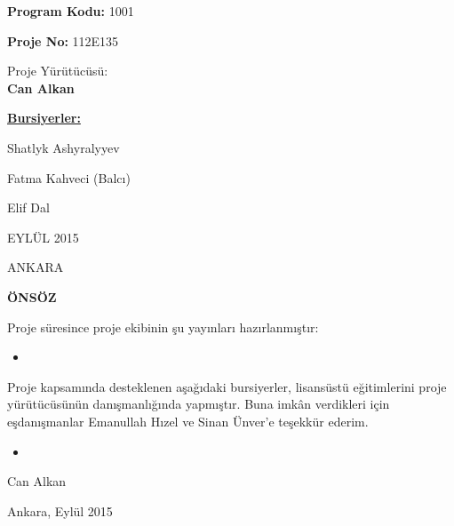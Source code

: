 \documentclass[12pt]{article}
\begin{document}
\begin{center}
\medskip
{\LARGE \textbf{Program Kodu:} 1001}

\bigskip
{\LARGE \textbf{Proje No:} 112E135}

\bigskip
{\LARGE Proje Yürütücüsü:\\
\textbf{Can Alkan}}

\end{center}



\bigskip


\bigskip
\noindent
{\Large
\noindent
\underline{\bf Bursiyerler:}

\noindent
Shatlyk Ashyralyyev

\noindent
Fatma Kahveci (Balcı)

\noindent
Elif Dal


}



\bigskip





\begin{center}
{\Large EYLÜL 2015

\vspace{1mm}
ANKARA}
\end{center}


\linespread{1.5}

\newpage\setlength{\parskip}{3mm} 
\onehalfspacing
\bigskip
\setcounter{page}{1}
\begin{center}
{\LARGE \bf ÖNSÖZ}
\end{center}


Proje süresince proje ekibinin şu yayınları hazırlanmıştır: 

\begin{itemize}
\item
\end{itemize}

 
Proje kapsamında desteklenen aşağıdaki bursiyerler,  lisansüstü eğitimlerini 
proje yürütücüsünün danışmanlığında
yapmıştır. Buna imk\^an verdikleri için eşdanışmanlar Emanullah Hızel ve Sinan Ünver'e teşekkür ederim.
\begin{itemize}
\item
\end{itemize}


\bigskip
\hfill Can Alkan

\hfill Ankara, Eylül 2015
\newpage

\setlength{\parskip}{1mm} 
\end{document}
